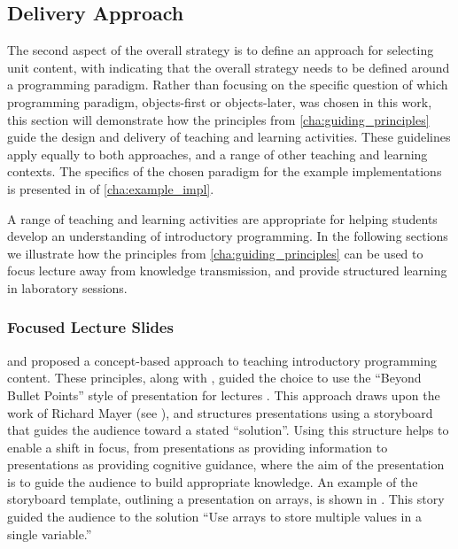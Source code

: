 %
%
% 


\clearpage
\subsection{Delivery Approach} %
\label{sub:delivery_approach}

The second aspect of the overall strategy is to define an approach for selecting unit content, with  indicating that the overall strategy needs to be defined around a programming paradigm. Rather than focusing on the specific question of which programming paradigm, objects-first or objects-later, was chosen in this work, this section will demonstrate how the principles from \cref{cha:guiding_principles} guide the design and delivery of teaching and learning activities. These guidelines apply equally to both approaches, and a range of other teaching and learning contexts. The specifics of the chosen paradigm for the example implementations is presented in  of \cref{cha:example_impl}.

A range of teaching and learning activities are appropriate for helping students develop an understanding of introductory programming. In the following sections we illustrate how the principles from \cref{cha:guiding_principles} can be used to focus lecture away from knowledge transmission, and provide structured learning in laboratory sessions.

\subsubsection{Focused Lecture Slides} %
\label{ssub:lecture_slides}

 and  proposed a concept-based approach to teaching introductory programming content. These principles, along with , guided the choice to use the ``Beyond Bullet Points'' style of presentation for lectures \cite{Atkinson:2007}. This approach draws upon the work of Richard Mayer (see \citet{Mayer:2005}), and structures presentations using a storyboard that guides the audience toward a stated ``solution''. Using this structure helps to enable a shift in focus, from presentations as providing information to presentations as providing cognitive guidance, where the aim of the presentation is to guide the audience to build appropriate knowledge. An example of the storyboard template, outlining a presentation on arrays, is shown in . This story guided the audience to the solution ``Use arrays to store multiple values in a single variable.''

